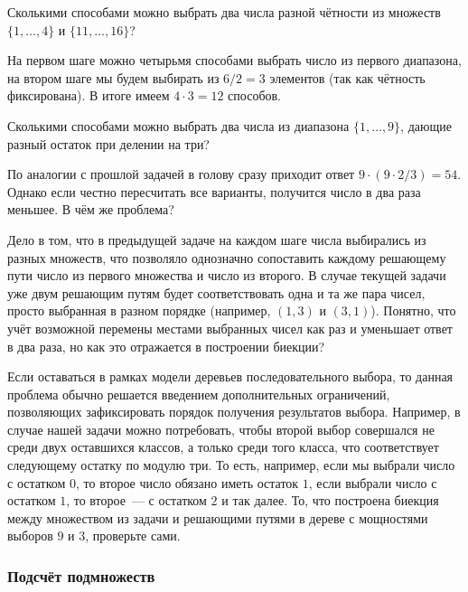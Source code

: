 \begin{Exercise}[counter=SecExercise]
    \noindent
    Сколькими способами можно выбрать два числа разной чётности из множеств $ \{1, \ldots, 4\} $ и $ \{ 11, \ldots, 16 \} $?
\end{Exercise}

\begin{Answer}
    \noindent
    На первом шаге можно четырьмя способами выбрать число из первого диапазона,
    на втором шаге мы будем выбирать из $ 6 / 2 = 3 $ элементов (так как чётность фиксирована).
    В итоге имеем $ 4 \cdot 3 = 12 $ способов.
\end{Answer}

\begin{Exercise}[counter=SecExercise]
    \noindent
    Сколькими способами можно выбрать два числа из диапазона $ \{ 1, \ldots, 9 \} $, дающие разный остаток при делении на три?
\end{Exercise}

По аналогии с прошлой задачей в голову сразу приходит ответ $ 9 \cdot (9 \cdot 2 / 3) = 54 $.
Однако если честно пересчитать все варианты, получится число в два раза меньшее.
В чём же проблема?

Дело в том, что в предыдущей задаче на каждом шаге числа выбирались из разных множеств,
что позволяло однозначно сопоставить каждому решающему пути число из первого множества и число из второго.
В случае текущей задачи уже двум решающим путям будет соответствовать одна и та же пара чисел, просто выбранная в разном порядке (например, $ (1, 3) $ и $ (3, 1) $).
Понятно, что учёт возможной перемены местами выбранных чисел как раз и уменьшает ответ в два раза, но как это отражается в построении биекции?

Если оставаться в рамках модели деревьев последовательного выбора, то данная проблема обычно решается введением дополнительных ограничений,
позволяющих зафиксировать порядок получения результатов выбора.
Например, в случае нашей задачи можно потребовать, чтобы второй выбор совершался не среди двух оставшихся классов,
а только среди того класса, что соответствует следующему остатку по модулю три.
То есть, например, если мы выбрали число с остатком $ 0 $, то второе число обязано иметь остаток $ 1 $,
если выбрали число с остатком $ 1 $, то второе~--- с остатком $ 2 $ и так далее.
То, что построена биекция между множеством из задачи и решающими путями в дереве с мощностями выборов $ 9 $ и $ 3 $, проверьте сами.

\subsubsection{Подсчёт подмножеств}

